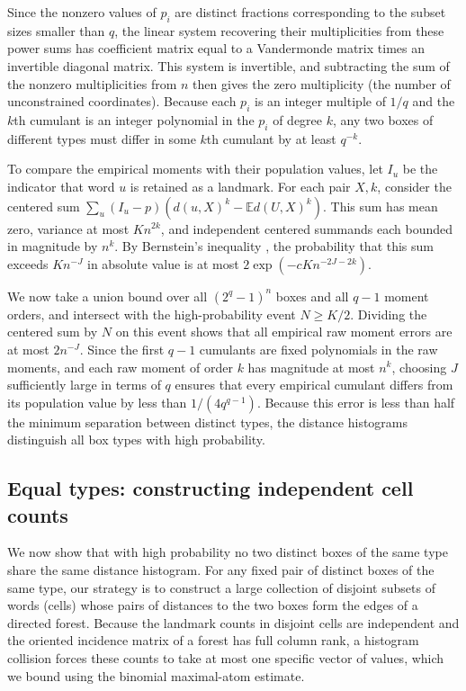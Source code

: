 Since the nonzero values of $p_i$ are distinct fractions corresponding to the subset sizes smaller than $q$, the linear system recovering their multiplicities from these power sums has coefficient matrix equal to a Vandermonde matrix times an invertible diagonal matrix. This system is invertible, and subtracting the sum of the nonzero multiplicities from $n$ then gives the zero multiplicity (the number of unconstrained coordinates). Because each $p_i$ is an integer multiple of $1/q$ and the $k$th cumulant is an integer polynomial in the $p_i$ of degree $k$, any two boxes of different types must differ in some $k$th cumulant by at least $q^{-k}$.

To compare the empirical moments with their population values, let $I_u$ be the indicator that word $u$ is retained as a landmark. For each pair $X,k$, consider the centered sum $\sum_u (I_u-p)(d(u,X)^k-\mathbb E d(U,X)^k)$. This sum has mean zero, variance at most $Kn^{2k}$, and independent centered summands each bounded in magnitude by $n^k$. By Bernstein's inequality \cite{BLM}, the probability that this sum exceeds $Kn^{-J}$ in absolute value is at most $2\exp(-cKn^{-2J-2k})$.

We now take a union bound over all $(2^q-1)^n$ boxes and all $q-1$ moment orders, and intersect with the high-probability event $N\ge K/2$. Dividing the centered sum by $N$ on this event shows that all empirical raw moment errors are at most $2n^{-J}$. Since the first $q-1$ cumulants are fixed polynomials in the raw moments, and each raw moment of order $k$ has magnitude at most $n^k$, choosing $J$ sufficiently large in terms of $q$ ensures that every empirical cumulant differs from its population value by less than $1/(4q^{q-1})$. Because this error is less than half the minimum separation between distinct types, the distance histograms distinguish all box types with high probability.

\subsection{Equal types: constructing independent cell counts}\label{sec:box-forest}
We now show that with high probability no two distinct boxes of the same type share the same distance histogram. For any fixed pair of distinct boxes of the same type, our strategy is to construct a large collection of disjoint subsets of words (cells) whose pairs of distances to the two boxes form the edges of a directed forest. Because the landmark counts in disjoint cells are independent and the oriented incidence matrix of a forest has full column rank, a histogram collision forces these counts to take at most one specific vector of values, which we bound using the binomial maximal-atom estimate.

